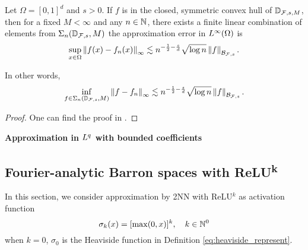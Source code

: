 \begin{theorem}
    Let $\Omega = [0,1]^d$ and $s > 0$. If $f$ is in the closed, symmetric
    convex hull of $\mathbb{D}_{\mathcal{F}, s, M}$, then for a fixed $M<\infty$
    and any $n \in \mathbb{N}$, there exists a finite linear combination of elements
    from $\Sigma_n(\mathbb{D}_{\mathcal{F}, s}, M)$ the approximation error in
    $L^{\infty}(\Omega)$ is
    \begin{equation}
        \sup_{x\in \Omega} \left\| f(x)-f_n(x) \right\|_{\infty} \lesssim 
        n^{-\frac{1}{2}-\frac{s}{d}} \sqrt{\log{n}} \left\| f \right\|_{\mathcal{B}_{\mathcal{F},s}}.
    \end{equation}

    In other words,
    \begin{equation}
        \inf_{f\in \Sigma_n(\mathbb{D}_{\mathcal{F}, s}, M)} 
        \left\| f-f_n \right\|_{\infty} \lesssim 
        n^{-\frac{1}{2}-\frac{s}{d}} \sqrt{\log{n}} \left\| f \right\|_{\mathcal{B}_{\mathcal{F},s}}.
    \end{equation}
\end{theorem}

\begin{proof}
    One can find the proof in
    \cite{klusowskiApproximationCombinationsReLU2018,siegelSharpBoundsApproximation2022}.
\end{proof}

\textbf{Approximation in $L^{q}$ with bounded coefficients}

\subsection{Fourier-analytic Barron spaces with ReLU\textsuperscript{k}}

In this section, we consider approximation by 2NN with ReLU$^k$ as activation
function
\begin{equation}
    \sigma_k(x) = [\max(0, x)]^k, \quad k \in \mathbb{N}^0
\end{equation}
when $k = 0$, $\sigma_0$ is the Heaviside function in Definition
\ref{eq:heaviside_represent}.


